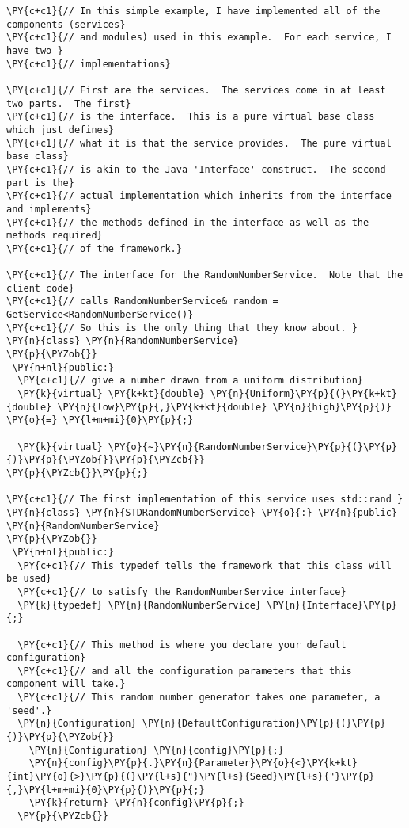 \begin{Verbatim}[commandchars=\\\{\}]
\PY{c+c1}{// In this simple example, I have implemented all of the components (services}
\PY{c+c1}{// and modules) used in this example.  For each service, I have two }
\PY{c+c1}{// implementations}

\PY{c+c1}{// First are the services.  The services come in at least two parts.  The first}
\PY{c+c1}{// is the interface.  This is a pure virtual base class which just defines}
\PY{c+c1}{// what it is that the service provides.  The pure virtual base class}
\PY{c+c1}{// is akin to the Java 'Interface' construct.  The second part is the}
\PY{c+c1}{// actual implementation which inherits from the interface and implements}
\PY{c+c1}{// the methods defined in the interface as well as the methods required}
\PY{c+c1}{// of the framework.}

\PY{c+c1}{// The interface for the RandomNumberService.  Note that the client code}
\PY{c+c1}{// calls RandomNumberService& random = GetService<RandomNumberService()}
\PY{c+c1}{// So this is the only thing that they know about. }
\PY{n}{class} \PY{n}{RandomNumberService}
\PY{p}{\PYZob{}}
 \PY{n+nl}{public:}
  \PY{c+c1}{// give a number drawn from a uniform distribution}
  \PY{k}{virtual} \PY{k+kt}{double} \PY{n}{Uniform}\PY{p}{(}\PY{k+kt}{double} \PY{n}{low}\PY{p}{,}\PY{k+kt}{double} \PY{n}{high}\PY{p}{)} \PY{o}{=} \PY{l+m+mi}{0}\PY{p}{;}
  
  \PY{k}{virtual} \PY{o}{~}\PY{n}{RandomNumberService}\PY{p}{(}\PY{p}{)}\PY{p}{\PYZob{}}\PY{p}{\PYZcb{}}
\PY{p}{\PYZcb{}}\PY{p}{;}

\PY{c+c1}{// The first implementation of this service uses std::rand }
\PY{n}{class} \PY{n}{STDRandomNumberService} \PY{o}{:} \PY{n}{public} \PY{n}{RandomNumberService}
\PY{p}{\PYZob{}}
 \PY{n+nl}{public:}
  \PY{c+c1}{// This typedef tells the framework that this class will be used}
  \PY{c+c1}{// to satisfy the RandomNumberService interface}
  \PY{k}{typedef} \PY{n}{RandomNumberService} \PY{n}{Interface}\PY{p}{;}

  \PY{c+c1}{// This method is where you declare your default configuration}
  \PY{c+c1}{// and all the configuration parameters that this component will take.}
  \PY{c+c1}{// This random number generator takes one parameter, a 'seed'.}
  \PY{n}{Configuration} \PY{n}{DefaultConfiguration}\PY{p}{(}\PY{p}{)}\PY{p}{\PYZob{}}
    \PY{n}{Configuration} \PY{n}{config}\PY{p}{;}
    \PY{n}{config}\PY{p}{.}\PY{n}{Parameter}\PY{o}{<}\PY{k+kt}{int}\PY{o}{>}\PY{p}{(}\PY{l+s}{"}\PY{l+s}{Seed}\PY{l+s}{"}\PY{p}{,}\PY{l+m+mi}{0}\PY{p}{)}\PY{p}{;}
    \PY{k}{return} \PY{n}{config}\PY{p}{;}
  \PY{p}{\PYZcb{}}


\end{Verbatim}
